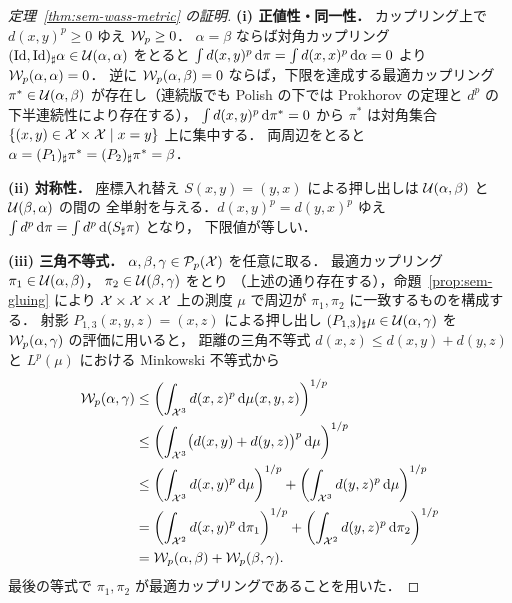 \begin{proof}[定理~\ref{thm:sem-wass-metric} の証明]
  \textbf{(i) 正値性・同一性．}
  カップリング上で $d(x, y)^p \geq 0$ ゆえ $\mathcal{W}_p \geq 0$．
  $\alpha = \beta$ ならば対角カップリング
  $(\operatorname{Id}, \operatorname{Id})_\sharp \alpha \in \mathcal{U}(\alpha, \alpha)$ をとると
  $\int d(x, y)^p \, \mathrm{d}\pi = \int d(x, x)^p \, \mathrm{d}\alpha = 0$ より
  $\mathcal{W}_p(\alpha, \alpha) = 0$．
  逆に $\mathcal{W}_p(\alpha, \beta) = 0$ ならば，下限を達成する最適カップリング
  $\pi^* \in \mathcal{U}(\alpha, \beta)$ が存在し（連続版でも Polish の下では
  Prokhorov の定理と $d^p$ の下半連続性により存在する），
  $\int d(x, y)^p \, \mathrm{d}\pi^* = 0$ から $\pi^*$ は対角集合
  $\{(x, y) \in \mathcal{X} \times \mathcal{X} \mid x = y\}$ 上に集中する．
  両周辺をとると $\alpha = (P_1)_\sharp \pi^* = (P_2)_\sharp \pi^* = \beta$．

  \textbf{(ii) 対称性．}
  座標入れ替え $S(x, y) = (y, x)$ による押し出しは
  $\mathcal{U}(\alpha, \beta)$ と $\mathcal{U}(\beta, \alpha)$ の間の
  全単射を与える．$d(x, y)^p = d(y, x)^p$ ゆえ
  $\int d^p \, \mathrm{d}\pi = \int d^p \, \mathrm{d}(S_\sharp \pi)$ となり，
  下限値が等しい．

  \textbf{(iii) 三角不等式．}
  $\alpha, \beta, \gamma \in \mathcal{P}_p(\mathcal{X})$ を任意に取る．
  最適カップリング $\pi_1 \in \mathcal{U}(\alpha, \beta)$，
  $\pi_2 \in \mathcal{U}(\beta, \gamma)$ をとり
  （上述の通り存在する），命題~\ref{prop:sem-gluing}
  により $\mathcal{X} \times \mathcal{X} \times \mathcal{X}$ 上の測度 $\mu$ で周辺が
  $\pi_1, \pi_2$ に一致するものを構成する．
  射影 $P_{1,3}(x, y, z) = (x, z)$ による押し出し
  $(P_{1,3})_\sharp \mu \in \mathcal{U}(\alpha, \gamma)$
  を $\mathcal{W}_p(\alpha, \gamma)$ の評価に用いると，
  距離の三角不等式 $d(x, z) \leq d(x, y) + d(y, z)$ と
  $L^p(\mu)$ における Minkowski 不等式から
  \begin{align*}
    \mathcal{W}_p(\alpha, \gamma)
    &\leq \left( \int_{\mathcal{X}^3} d(x, z)^p \, \mathrm{d}\mu(x, y, z) \right)^{1/p} \\
    &\leq \left( \int_{\mathcal{X}^3} \bigl( d(x, y) + d(y, z) \bigr)^p \, \mathrm{d}\mu \right)^{1/p} \\
    &\leq \left( \int_{\mathcal{X}^3} d(x, y)^p \, \mathrm{d}\mu \right)^{1/p}
       + \left( \int_{\mathcal{X}^3} d(y, z)^p \, \mathrm{d}\mu \right)^{1/p} \\
    &= \left( \int_{\mathcal{X}^2} d(x, y)^p \, \mathrm{d}\pi_1 \right)^{1/p}
       + \left( \int_{\mathcal{X}^2} d(y, z)^p \, \mathrm{d}\pi_2 \right)^{1/p} \\
    &= \mathcal{W}_p(\alpha, \beta) + \mathcal{W}_p(\beta, \gamma).
  \end{align*}
  最後の等式で $\pi_1, \pi_2$ が最適カップリングであることを用いた．
\end{proof}

